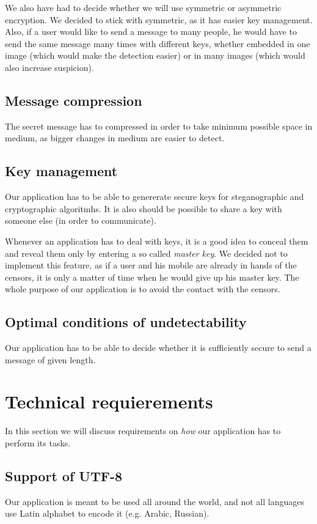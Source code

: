We also have had to decide whether we will use symmetric or asymmetric
encryption. We decided to stick with symmetric, as it has easier key management.
Also, if a user would like to send a message to many people, he would have to
send the same message many times with different keys, whether embedded in one 
image (which would make the detection easier) or in many images (which would
also increase suspicion).

\subsection{Message compression}
The secret message has to compressed in order to take minimum possible space in medium,
as bigger changes in medium are easier to detect.

\subsection{Key management}
Our application has to be able to genererate secure keys for steganographic and
cryptographic algoritmhs. It is also should be possible to share a key with someone
else (in order to communicate).

Whenever an application has to deal with keys, it is a good idea to conceal them
and reveal them only by entering a so called \emph{master key}. We decided not to implement
this feature, as if a user and his mobile are already in hands of the censors, it is only 
a matter of time when he would give up his master key. The whole purpose of our application
is to avoid the contact with the censors.

\subsection{Optimal conditions of undetectability}
Our application has to be able to decide whether it is sufficiently secure to 
send a message of given length. 



\section{Technical requierements}
In this section we will discuss requirements on \emph{how} our application has
to perform its tasks.

\subsection{Support of UTF-8}
Our application is meant to be used all around the world, and not all languages use
Latin alphabet to encode it (e.g. Arabic, Russian). 

